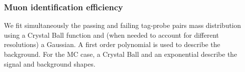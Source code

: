



\subsubsection{Muon identification efficiency}

We fit simultaneously the passing and failing tag-probe pairs mass distribution using a Crystal Ball function and (when needed to account for different resolutions) a Gaussian.
A first order polynomial is used to describe the background. For the MC case, a  Crystal Ball and an exponential describe the signal and background shapes. 

